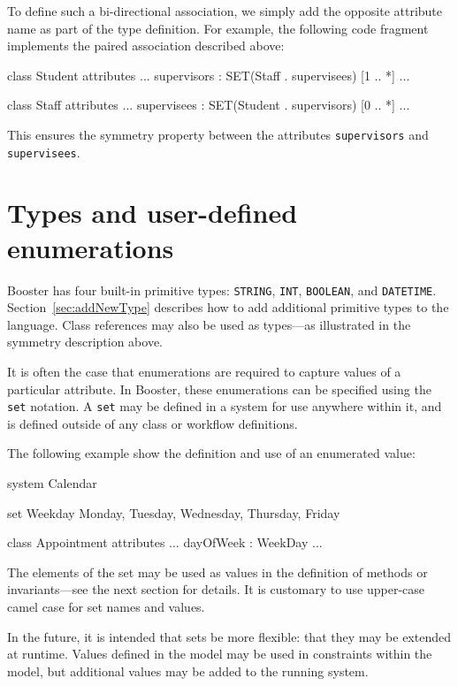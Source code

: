 To define such a bi-directional association, we simply add the
opposite attribute name as part of the type definition.  For example,
the following code fragment implements the paired association
described above:

\begin{code}
  class Student {
    attributes
      ...
      supervisors : SET(Staff . supervisees) [1 .. *]
      ...
  }

  class Staff {
    attributes
      ...
      supervisees : SET(Student . supervisors) [0 .. *]
      ...
  }
\end{code}

This ensures the symmetry property between the attributes
\verb|supervisors| and \verb|supervisees|.

\section{Types and user-defined enumerations}

Booster has four built-in primitive types: \verb|STRING|, \verb|INT|,
\verb|BOOLEAN|, and \verb|DATETIME|.  Section~\ref{sec:addNewType}
describes how to add additional primitive types to the language.  
Class references may also be used as types---as illustrated in the
symmetry description above.

It is often the case that enumerations are required to capture values
of a particular attribute.  In Booster, these enumerations can be
specified using the \verb|set| notation.  A \verb|set| may be defined
in a system for use anywhere within it, and is defined outside of any
class or workflow definitions.

The following example show the definition and use of an enumerated
value:

\begin{code}
system Calendar

set Weekday { Monday, Tuesday, Wednesday, Thursday, Friday}

class Appointment {
  attributes
    ...
    dayOfWeek : WeekDay
    ...
}
\end{code}

The elements of the set may be used as values in the definition of
methods or invariants---see the next section for details.  It is
customary to use upper-case camel case for set names and values.

In the future, it is intended that sets be more flexible: that they
may be extended at runtime.  Values defined in the model may be used
in constraints within the model, but additional values may be added to
the running system.

